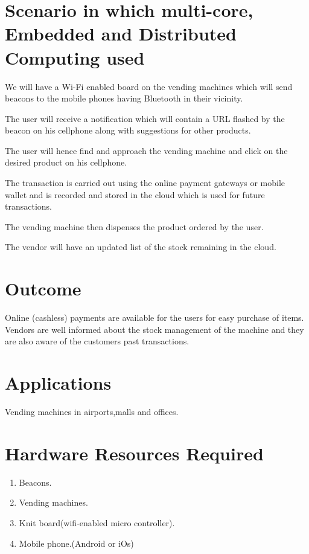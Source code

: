 \documentclass[oneside,a4paper,12pt]{report}
\begin{document}
\section{Scenario in which multi-core, Embedded and Distributed Computing used}

 We will have a Wi-Fi enabled board on the vending machines which will send beacons to the mobile phones having Bluetooth in their vicinity.
 
 The user will receive a notification which will contain a URL flashed by the beacon on his cellphone along with suggestions for other products.

The user will hence find and approach the vending machine and click on the desired product on his cellphone.

 The transaction is carried out using the online payment gateways or mobile wallet and is recorded and stored in the cloud which is used for future transactions.

 The vending machine then dispenses the product ordered by the user.

The vendor will have an updated list of the stock remaining in the cloud.

\section{Outcome}

 Online (cashless) payments are available for the users for easy purchase of items.
Vendors are well informed about the stock management of the machine and they are also aware of the customers past transactions.

\section{Applications}

Vending machines in airports,malls and offices.

\section{Hardware Resources Required}
\begin{enumerate}
\item Beacons.
\item Vending machines.
\item Knit board(wifi-enabled micro controller).
\item Mobile phone.(Android or iOs)
\end{enumerate}
\end{document}
